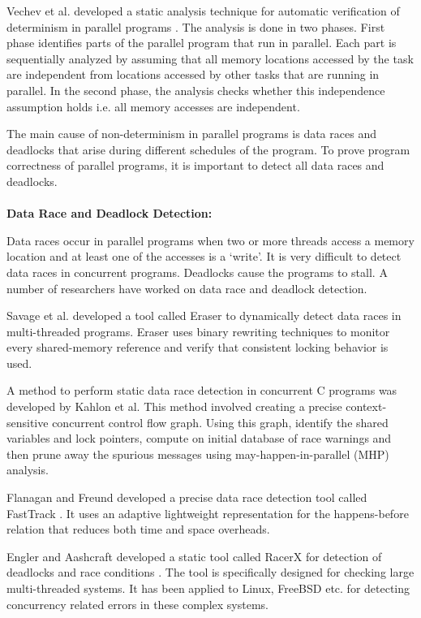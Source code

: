 Vechev et al. developed a static analysis technique for automatic verification of determinism in parallel programs \cite{vechev2011automatic}. The analysis is done in two phases. First phase identifies parts of the parallel program that run in parallel. Each part is sequentially analyzed by assuming that all memory locations accessed by the task are independent from locations accessed by other tasks that are running in parallel. In the second phase, the analysis checks whether this independence assumption holds i.e. all memory accesses are independent.

The main cause of non-determinism in parallel programs is data races and deadlocks that arise during different schedules of the program. To prove program correctness of parallel programs, it is important to detect all data races and deadlocks.
\\
\\
\textbf{Data Race and Deadlock Detection: }

Data races occur in parallel programs when two or more threads access a memory location and at least one of the accesses is a ‘write’.  It is very difficult to detect data races in concurrent programs. Deadlocks cause the programs to stall. A number of researchers have worked on data race and deadlock detection.

Savage et al. developed a tool called Eraser \cite{savage1997eraser} to dynamically detect data races in multi-threaded programs. Eraser uses binary rewriting techniques to monitor every shared-memory reference and verify that consistent locking behavior is used.

A method to perform static data race detection in concurrent C programs was developed by Kahlon et al. This method \cite{kahlon2009static} involved creating a precise context-sensitive concurrent control flow graph. Using this graph, identify the shared variables and lock pointers, compute on initial database of race warnings and then prune away the spurious messages using may-happen-in-parallel (MHP) analysis.

Flanagan and Freund developed a precise data race detection tool called FastTrack \cite{flanagan2009fasttrack}. It uses an adaptive lightweight representation for the happens-before relation that reduces both time and space overheads.

Engler and Aashcraft developed a static tool called RacerX for detection of deadlocks and race conditions \cite{engler2003racerx}. The tool is specifically designed for checking large multi-threaded systems. It has been applied to Linux, FreeBSD etc. for detecting concurrency related errors in these complex systems. 